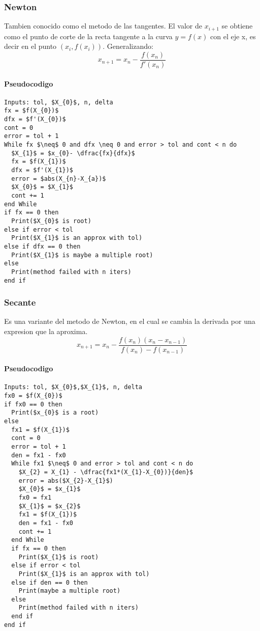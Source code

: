 \documentclass[11pt]{article}
\begin{document}
\subsubsection{Newton}
Tambien conocido como el metodo de las tangentes. El valor de $x_{i+1}$ se obtiene como el punto de corte de la recta tangente a la curva $y = f(x)$ con el eje x, es decir en el punto $(x_{i},f(x_{i}))$. Generalizando:
\[ x_{n+1} = x_{n} - \dfrac{f(x_{n})}{f'(x_{n})} \]

\paragraph{Pseudocodigo\\}
\begin{lstlisting}[frame=single, mathescape=true]
Inputs: tol, $X_{0}$, n, delta
fx = $f(X_{0})$
dfx = $f'(X_{0})$
cont = 0
error = tol + 1
While fx $\neq$ 0 and dfx \neq 0 and error > tol and cont < n do
  $X_{1}$ = $x_{0}- \dfrac{fx}{dfx}$
  fx = $f(X_{1})$
  dfx = $f'(X_{1})$
  error = $abs(X_{n}-X_{a})$
  $X_{0}$ = $X_{1}$
  cont += 1
end While
if fx == 0 then
  Print($X_{0}$ is root)
else if error < tol 
  Print($X_{1}$ is an approx with tol)
else if dfx == 0 then
  Print($X_{1}$ is maybe a multiple root)
else
  Print(method failed with n iters)
end if
\end{lstlisting}

\subsubsection{Secante}
Es una variante del metodo de Newton, en el cual se cambia la derivada por una expresion que la aproxima.
\[ x_{n+1} = x_{n} - \dfrac{f(x_{n})(x_{n}-x_{n-1})}{f(x_{n})-f(x_{n-1})} \]
\paragraph{Pseudocodigo\\}
\begin{lstlisting}[frame=single, mathescape=true]
Inputs: tol, $X_{0}$,$X_{1}$, n, delta
fx0 = $f(X_{0})$
if fx0 == 0 then
  Print($x_{0}$ is a root)
else
  fx1 = $f(X_{1})$
  cont = 0
  error = tol + 1
  den = fx1 - fx0
  While fx1 $\neq$ 0 and error > tol and cont < n do
    $X_{2} = X_{1} - \dfrac{fx1*(X_{1}-X_{0})}{den}$
    error = abs($X_{2}-X_{1}$)
    $X_{0}$ = $x_{1}$
    fx0 = fx1
    $X_{1}$ = $x_{2}$
    fx1 = $f(X_{1})$
    den = fx1 - fx0
    cont += 1
  end While
  if fx == 0 then
    Print($X_{1}$ is root)
  else if error < tol 
    Print($X_{1}$ is an approx with tol)
  else if den == 0 then
    Print(maybe a multiple root)
  else
    Print(method failed with n iters)
  end if
end if
\end{lstlisting}
\end{document}
